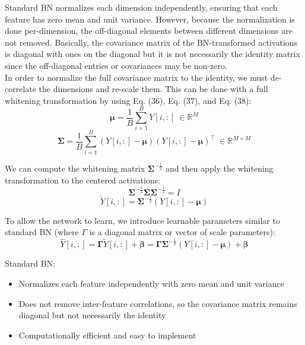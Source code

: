 \documentclass{article}
\begin{document}
{\color{blue}
Standard BN normalizes each dimension independently, ensuring that each feature has zero mean and unit variance. However, because the normalization is done per-dimension, the off-diagonal elements between different dimensions are not removed. Basically, the covariance matrix of the BN-transformed activations is diagonal with ones on the diagonal but it is not necessarily the identity matrix since the off-diagonal entries or covariances may be non-zero. \\

In order to normalize the full covariance matrix to the identity, we must de-correlate the dimensions and re-scale them. This can be done with a full whitening transformation by using Eq. (36), Eq. (37), and Eq. (38):
\begin{equation}
    \boldsymbol{\mu}= \frac{1}{B} \sum_{i=1}^{B} Y[i,:] \ \in \mathbb{R}^M
\end{equation}
\begin{equation}
    \boldsymbol{\Sigma}= \frac{1}{B} \sum_{i=1}^{B} (Y[i,:]- \boldsymbol{\mu})(Y[i,:]- \boldsymbol{\mu})^{\top} \ \in \mathbb{R}^{M \times M}
\end{equation}

We can compute the whitening matrix $\boldsymbol{\Sigma}^{-\frac{1}{2}}$ and then apply the whitening transformation to the centered activations:
\begin{equation}
    \boldsymbol{\Sigma}^{-\frac{1}{2}} \boldsymbol{\Sigma}\boldsymbol{\Sigma}^{-\frac{1}{2}}= I
\end{equation}
\begin{equation}
    \tilde{Y}[i,:]= \boldsymbol{\Sigma}^{-\frac{1}{2}} (Y[i,:]- \boldsymbol{\mu})
\end{equation}

To allow the network to learn, we introduce learnable parameters similar to standard BN (where $\Gamma$ is a diagonal matrix or vector of scale parameters):
\begin{equation}
    \hat{Y}[i,:]= \boldsymbol{\Gamma} \tilde{Y}[i,:]+ \boldsymbol{\beta}= \boldsymbol{\Gamma} \boldsymbol{\Sigma}^{-\frac{1}{2}} (Y[i,:]- \boldsymbol{\mu})+ \boldsymbol{\beta}
\end{equation}

\noindent
Standard BN:
\begin{itemize}
    \item Normalizes each feature independently with zero mean and unit variance
    \item Does not remove inter-feature correlations, so the covariance matrix remains diagonal but not necessarily the identity
    \item Computationally efficient and easy to implement
\end{itemize}

}
\end{document}
